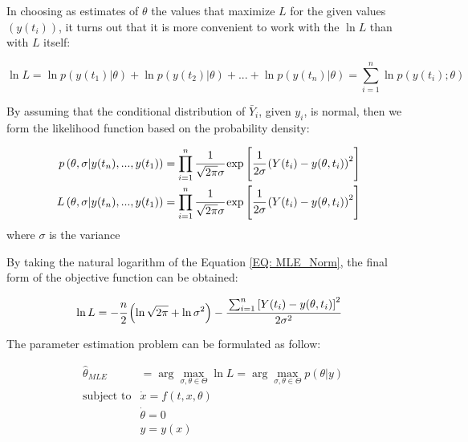 \documentclass[../Article_Model_Parameters.tex]{subfiles}
\begin{document}
		In choosing as estimates of $\theta$ the values that maximize $L$ for the given values $\left( y(t_i) \right)$, it turns out that it is more convenient to work with the $\ln L$ than with $L$ itself:
		
		{\footnotesize 
			\begin{equation}
				\ln L = \ln p \left( y(t_1)| \theta \right) + \ln p\left( y(t_2)| \theta \right) + ... + \ln p \left( y(t_n)| \theta \right) = \sum_{i=1}^{n} \ln p\left( y(t_i); \theta \right)
		\end{equation} }
		
		By assuming that the conditional distribution of $\bar{Y}_i$, given $y_i$, is normal, then we form the likelihood function based on the probability density:
		
		{\footnotesize
			\begin{align} \label{EQ: MLE_Norm}
				p\left(  \theta, \sigma | y(t_n),...,y(t_1) \right) &= \prod_{i=1}^{n} \cfrac{1}{\sqrt{2 \pi} \sigma } \exp \left[ \cfrac{1}{2  \sigma } \left( Y(t_i) - y(\theta , t_i) \right)^2 \right] \nonumber \\
				L\left( \theta, \sigma | y(t_n),...,y(t_1) \right) &= \prod_{i=1}^{n} \cfrac{1}{\sqrt{2 \pi} \sigma } \exp \left[ \cfrac{1}{2  \sigma } \left( Y(t_i) - y(\theta , t_i) \right)^2 \right]
		\end{align}}
		where $\sigma$ is the variance
		
		By taking the natural logarithm of the Equation \ref{EQ: MLE_Norm}, the final form of the objective function can be obtained:
		
		{\footnotesize
			\begin{equation}
				\ln L = -\cfrac{n}{2} \left( \ln \sqrt{2 \pi} + \ln \sigma^2 \right)
				- \cfrac{ \sum_{i=1}^{n} \left[  Y(t_i) - y(\theta , t_i) \right]^2 }{2 \sigma^2}
			\end{equation}
		}
		
		The parameter estimation problem can be formulated as follow:
		
		{\footnotesize
			\begin{equation}
				\begin{aligned} \label{EQ: Optimization_formulation_MLE}
					&\hat{\theta}_{MLE} &= \arg \max_{\sigma, \theta \in \Theta} \ln L = \arg \max_{\sigma,\theta \in \Theta} p(\theta|y) \\
					&\text{subject to}
					& \dot{x} = f(t,x,\theta) \\
					&& \dot{\theta} = 0 \\
					&& y = y(x)
				\end{aligned}
		\end{equation} }
		
\end{document}
